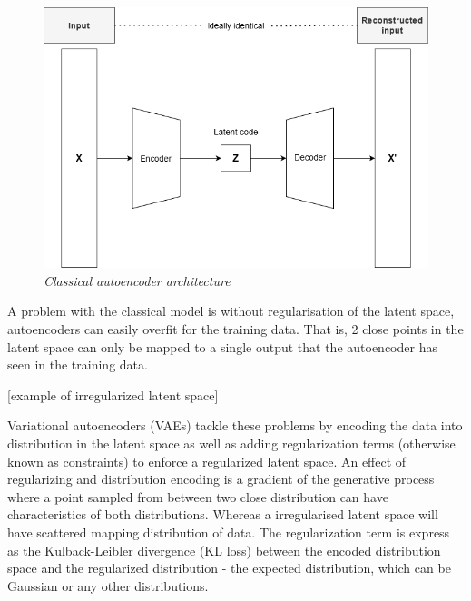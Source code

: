 \documentclass[12pt]{report}
\begin{document}
\begin{figure}[h]
	\centering
	\includegraphics[scale=0.7]{autoencoder-architecture}
	\caption{\textit{Classical autoencoder architecture \cite{autoencoder}}}
	\label{fig:autoencoder-architecture}
\end{figure}

A problem with the classical model is without regularisation of the latent space, autoencoders can easily overfit for the training data. That is, 2 close points in the latent space can only be mapped to a single output that the autoencoder has seen in the training data.

[example of irregularized latent space]

Variational autoencoders (VAEs) tackle these problems by encoding the data into distribution in the latent space as well as adding regularization terms (otherwise known as constraints) to enforce a regularized latent space. An effect of regularizing and distribution encoding is a gradient of the generative process where a point sampled from between two close distribution can have characteristics of both distributions. Whereas a irregularised latent space will have scattered mapping distribution of data. The regularization term is express as the Kulback-Leibler divergence (KL loss) \cite{kl-divergence} between the encoded distribution space and the regularized distribution - the expected distribution, which can be Gaussian or any other distributions. 
\end{document}
